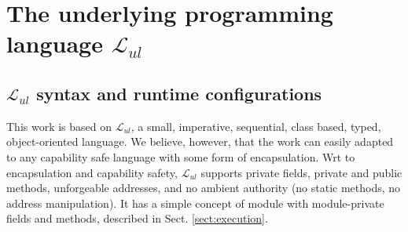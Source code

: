 \renewcommand{\LangOO}{\ensuremath{{\mathcal{L}}_{ul}}\xspace }

\section{The underlying programming language \LangOO}  
\label{sect:underlying}

\subsection{\LangOO syntax and runtime configurations}
\label{sub:Loo} 
{This work} is based on \LangOO, a {small}, imperative, sequential,  class based, typed, object-oriented language. 
 {We believe, however, that the work can easily adapted to any capability safe language with some form of encapsulation. 
Wrt to encapsulation and  capability safety},  \LangOO supports private fields, private and public methods, unforgeable addresses, and no ambient authority (no static methods, no address manipulation).
 It has a simple concept of module with module-private fields and methods, described in Sect. \ref{sect:execution}.
